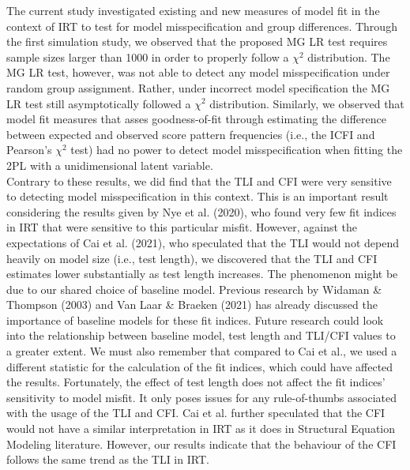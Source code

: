 \documentclass[Royal,sageapa,times,doublespace]{sagej}
\begin{document}
The current study investigated existing and new measures of model fit in the context of IRT to test for model misspecification and group differences. Through the first simulation study, we observed that the proposed MG LR test requires sample sizes larger than 1000 in order to properly follow a $\chi^2$ distribution. The MG LR test, however, was not able to detect any model misspecification under random group assignment. Rather, under incorrect model specification the MG LR test still asymptotically followed a $\chi^2$ distribution. Similarly, we observed that model fit measures that asses goodness-of-fit through estimating the difference between expected and observed score pattern frequencies (i.e., the ICFI and Pearson's $\chi^2$ test) had no power to detect model misspecification when fitting the 2PL with a unidimensional latent variable. \\
\indent Contrary to these results, we did find that the TLI and CFI were very sensitive to detecting model misspecification in this context. This is an important result considering the results given by Nye et al. (2020), who found very few fit indices in IRT that were sensitive to this particular misfit. However, against the expectations of Cai et al. (2021), who speculated that the TLI would not depend heavily on model size (i.e., test length), we discovered that the TLI and CFI estimates lower substantially as test length increases. The phenomenon might be due to our shared choice of baseline model. Previous research by Widaman \& Thompson (2003) and Van Laar \& Braeken (2021) has already discussed the importance of baseline models for these fit indices. Future research could look into the relationship between baseline model, test length and TLI/CFI values to a greater extent. We must also remember that compared to Cai et al., we used a different statistic for the calculation of the fit indices, which could have affected the results. Fortunately, the effect of test length does not affect the fit indices' sensitivity to model misfit. It only poses issues for any rule-of-thumbs associated with the usage of the TLI and CFI. Cai et al. further speculated that the CFI would not have a similar interpretation in IRT as it does in Structural Equation Modeling literature. However, our results indicate that the behaviour of the CFI follows the same trend as the TLI in IRT.  \\
\end{document}
